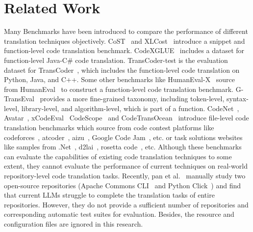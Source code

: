 \section{Related Work}
Many Benchmarks have been introduced to compare the performance of different translation techniques objectively. CoST~\cite{Zhu2022CoST} and XLCost~\cite{zhu2022xlcost} introduce a snippet and function-level code translation benchmark. CodeXGLUE~\cite{lu2021codexglue} includes a dataset for function-level Java-C\# code translation. TransCoder-test is the evaluation dataset for TransCoder~\cite{lachaux2020transcoder}, which includes the function-level code translation on Python, Java, and C++. Some other benchmarks like HumanEval-X~\cite{humanevalx} source from HumanEval~\cite{humaneval} to construct a function-level code translation benchmark. G-TransEval~\cite{jiao2023GTransEval} provides a more fine-grained taxonomy, including token-level, syntax-level, library-level, and algorithm-level, which is part of a function. CodeNet~\cite{puri2021codenet}, Avatar~\cite{ahmad2021avatar}, xCodeEval~\cite{khan2023xcodeeval} CodeScope~\cite{yan2023codescope} and CodeTransOcean~\cite{yan2023codetransocean} introduce file-level code translation benchmarks which source from code contest platforms like codeforces~\cite{Codeforces}, atcoder~\cite{atcoder}, aizu~\cite{aizu}, Google Code Jam~\cite{GoogleCodeJam}, etc. or task solutions websites like samples from .Net~\cite{dotnetsamples}, d2lai~\cite{d2lai}, rosetta code~\cite{rosettacode}, etc. 
Although these benchmarks can evaluate the capabilities of existing code translation techniques to some extent, they cannot evaluate the performance of current techniques on real-world repository-level code translation tasks. 
Recently, pan et al.~\cite{pan2024lost} manually study two open-source repositories (Apache Commons CLI~\cite{apachecommonscli} and Python Click~\cite{click}) and find that current LLMs struggle to complete the translation tasks of entire repositories. However, they do not provide a sufficient number of repositories and corresponding automatic test suites for evaluation. Besides, the resource and configuration files are ignored in this research.

